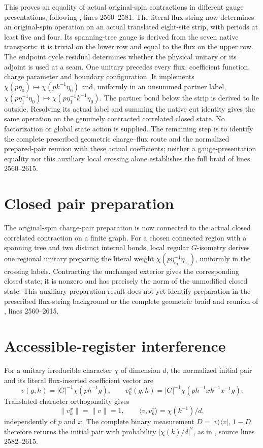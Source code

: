 \documentclass{article}
\begin{document}
This proves an equality of actual original-spin contractions in different
gauge presentations, following \cite{Schuch2010PEPS}, lines 2560--2581.
The literal flux string now determines an original-spin operation on an actual
translated eight-site strip, with periods at least five and four. Its
spanning-tree gauge is derived from the seven native transports: it is trivial
on the lower row and equal to the flux on the upper row. The endpoint cycle
residual determines whether the physical unitary or its adjoint is used at a
seam. One unitary precedes every flux, coefficient function, charge parameter
and boundary configuration. It implements
$\chi(p\eta_0)\mapsto\chi(pk^{-1}\eta_0)$ and, uniformly in an unsummed
partner label,
$\chi(p\eta_1^{-1}\eta_0)\mapsto\chi(p\eta_1^{-1}k^{-1}\eta_0)$. The partner
bond below the strip is derived to lie outside. Resolving its actual label and
summing the native cut identity gives the same operation on the genuinely
contracted correlated closed state. No factorization or global state action is
supplied. The remaining step is to identify the complete prescribed geometric
charge--flux route and the normalized prepared-pair reunion with these actual
coefficients; neither a gauge-presentation equality nor this auxiliary local
crossing alone establishes the full braid of lines 2560--2615.

\section{Closed pair preparation}
The original-spin charge-pair preparation is now connected to the actual
closed correlated contraction on a finite graph. For a chosen connected region
with a spanning tree and two distinct internal bonds, local regular
$G$-isometry derives one regional unitary preparing the literal weight
$\chi(p\eta_{e_1}^{-1}\eta_{e_0})$, uniformly in the crossing labels.
Contracting the unchanged exterior gives the corresponding closed state;
it is nonzero and has precisely the norm of the unmodified closed state.
This auxiliary preparation result does not yet identify preparation in the
prescribed flux-string background or the complete geometric braid and reunion
of \cite{Schuch2010PEPS}, lines 2560--2615.

\section{Accessible-register interference}
For a unitary irreducible character $\chi$ of dimension $d$, the normalized
initial pair and its literal flux-inserted coefficient vector are
\[
 v(g,h)=|G|^{-1}\chi(ph^{-1}g),\qquad
 v_k^x(g,h)=|G|^{-1}\chi(ph^{-1}xk^{-1}x^{-1}g).
\]
Translated character orthogonality gives
\[
 \|v_k^x\|=\|v\|=1,\qquad
 \langle v,v_k^x\rangle=\chi(k^{-1})/d,
\]
independently of $p$ and $x$.
The complete binary measurement $D=|v\rangle\langle v|$, $1-D$ therefore
returns the initial pair with probability $|\chi(k)/d|^2$, as in
\cite{Schuch2010PEPS}, source lines 2582--2615.
\end{document}

